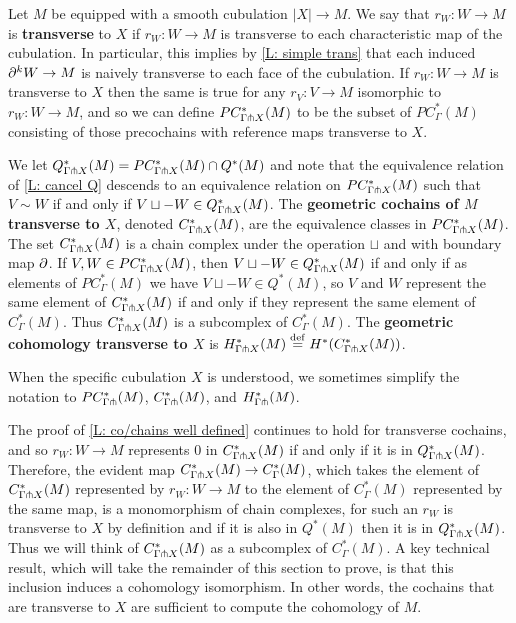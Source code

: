 \begin{definition}\label{D: trans cube}
	Let $M$ be equipped with a smooth cubulation $|X| \to M$.
	We say that $r_W \colon W \to M$ is \textbf{transverse} to $X$ if $r_W \colon W \to M$ is transverse to each characteristic map of the cubulation.
	In particular, this implies by \cref{L: simple trans} that each induced $\partial^kW \to M$ is naively transverse to each face of the cubulation.
	If $r_W \colon W \to M$ is transverse to $X$ then the same is true for any $r_V \colon V \to M$ isomorphic to $r_W \colon W \to M$, and so we can define $PC^*_{\Gamma \pitchfork X}(M)$ to be the subset of $PC^*_{\Gamma}(M)$ consisting of those precochains with reference maps transverse to $X$.

	We let $Q^*_{\Gamma \pitchfork X}(M) = PC_{\Gamma \pitchfork X}^*(M) \cap Q^*(M)$ and note that the equivalence relation of \cref{L: cancel Q} descends to an equivalence relation on $PC_{\Gamma \pitchfork X}^*(M)$ such that $V\sim W$ if and only if $V \sqcup -W \in Q^*_{\Gamma \pitchfork X}(M)$.
	The \textbf{geometric cochains of $M$ transverse to $X$}, denoted $C_{\Gamma \pitchfork X}^*(M)$, are the equivalence classes in $PC_{\Gamma \pitchfork X}^*(M)$.
	The set $C_{\Gamma \pitchfork X}^*(M)$ is a chain complex under the operation $\sqcup$ and with boundary map $\partial$.
	If $V, W \in PC_{\Gamma \pitchfork X}^*(M)$, then $V \sqcup -W \in Q^*_{\Gamma \pitchfork X}(M)$ if and only if as elements of $PC_\Gamma^*(M)$ we have $V \sqcup -W \in Q^*(M)$, so $V$ and $W$ represent the same element of $C_{\Gamma \pitchfork X}^*(M)$ if and only if they represent the same element of $C^*_\Gamma(M)$.
	Thus $C_{\Gamma \pitchfork X}^*(M)$ is a subcomplex of $C_\Gamma^*(M)$.
	The \textbf{geometric cohomology transverse to $X$} is $H_{\Gamma \pitchfork X}^*(M) \stackrel{\mathrm{def}}{=} H^*(C_{\Gamma \pitchfork X}^*(M))$.

	When the specific cubulation $X$ is understood, we sometimes simplify the notation to $PC_{\Gamma\pitchfork}^*(M)$, $C_{\Gamma\pitchfork}^*(M)$, and $H_{\Gamma\pitchfork}^*(M)$.
\end{definition}

The proof of \cref{L: co/chains well defined} continues to hold for transverse cochains, and so $r_W \colon W \to M$ represents $0$ in $C^*_{\Gamma \pitchfork X}(M)$ if and only if it is in $Q^*_{\Gamma \pitchfork X}(M)$.
Therefore, the evident map $C^*_{\Gamma \pitchfork X}(M) \to C^*_\Gamma(M)$, which takes the element of $C^*_{\Gamma \pitchfork X}(M)$ represented by $r_W \colon W \to M$ to the element of $C^*_\Gamma(M)$ represented by the same map, is a monomorphism of chain complexes, for such an $r_W$ is transverse to $X$ by definition and if it is also in $Q^*(M)$ then it is in $Q^*_{\Gamma \pitchfork X}(M)$.
Thus we will think of $C^*_{\Gamma \pitchfork X}(M)$ as a subcomplex of $C^*_\Gamma(M)$.
A key technical result, which will take the remainder of this section to prove,
is that this inclusion induces a cohomology isomorphism.
In other words, the cochains that are transverse to $X$ are sufficient to compute the cohomology of $M$.

